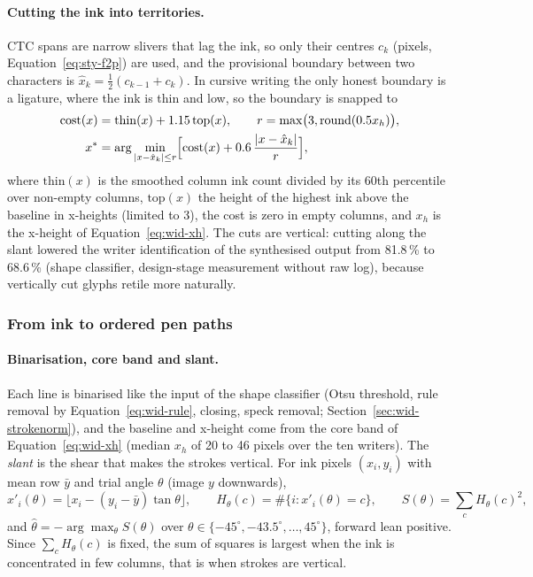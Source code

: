 \paragraph{Cutting the ink into territories.}
CTC spans are narrow slivers that lag the ink, so only their centres $c_k$ (pixels, Equation~\ref{eq:sty-f2p}) are used, and the provisional boundary between two characters is $\hat x_k=\tfrac12(c_{k-1}+c_k)$.
In cursive writing the only honest boundary is a ligature, where the ink is thin and low, so the boundary is snapped to
\begin{equation}
\begin{aligned}
\mathrm{cost}(x)&=\mathrm{thin}(x)+1.15\,\mathrm{top}(x),\qquad r=\max\bigl(3,\mathrm{round}(0.5x_h)\bigr),\\
x^*&=\arg\min_{|x-\hat x_k|\le r}\Bigl[\mathrm{cost}(x)+0.6\,\frac{|x-\hat x_k|}{r}\Bigr],
\end{aligned}
\label{eq:sty-cut}
\end{equation}
where $\mathrm{thin}(x)$ is the smoothed column ink count divided by its 60th percentile over non-empty columns, $\mathrm{top}(x)$ the height of the highest ink above the baseline in x-heights (limited to 3), the cost is zero in empty columns, and $x_h$ is the x-height of Equation~\ref{eq:wid-xh}.
The cuts are vertical: cutting along the slant lowered the writer identification of the synthesised output from 81.8\,\% to 68.6\,\% (shape classifier, design-stage measurement without raw log), because vertically cut glyphs retile more naturally.

\subsubsection{From ink to ordered pen paths}

\paragraph{Binarisation, core band and slant.}
Each line is binarised like the input of the shape classifier (Otsu threshold, rule removal by Equation~\ref{eq:wid-rule}, closing, speck removal; Section~\ref{sec:wid-strokenorm}), and the baseline and x-height come from the core band of Equation~\ref{eq:wid-xh} (median $x_h$ of 20 to 46 pixels over the ten writers).
The \emph{slant} is the shear that makes the strokes vertical.
For ink pixels $(x_i,y_i)$ with mean row $\bar y$ and trial angle $\theta$ (image $y$ downwards),
\begin{equation}
x'_i(\theta)=\bigl\lfloor x_i-(y_i-\bar y)\tan\theta\bigr\rfloor,\qquad H_\theta(c)=\#\{i:x'_i(\theta)=c\},\qquad S(\theta)=\sum_cH_\theta(c)^2 ,
\label{eq:sty-slant}
\end{equation}
and $\hat\theta=-\arg\max_\theta S(\theta)$ over $\theta\in\{-45^\circ,-43.5^\circ,\ldots,45^\circ\}$, forward lean positive.
Since $\sum_cH_\theta(c)$ is fixed, the sum of squares is largest when the ink is concentrated in few columns, that is when strokes are vertical.

